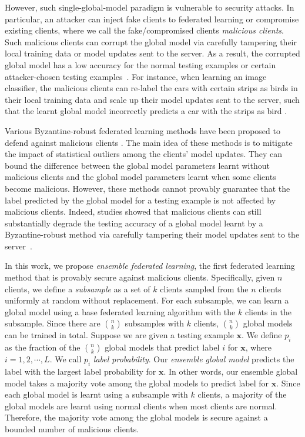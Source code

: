 \documentclass[letterpaper]{article} %
\begin{document}
However, such single-global-model paradigm is vulnerable to security attacks. In particular, an attacker can inject fake clients to federated learning or compromise existing clients, where we call the fake/compromised clients \emph{malicious clients}. Such malicious clients can corrupt the global model via carefully tampering their local training data or model updates sent to the server. As a result, the corrupted global model has a low accuracy for the normal testing examples \cite{fang2019local,Xie19} or certain attacker-chosen testing examples~\cite{Bagdasaryan18,Bhagoji19,xie2019dba}. For instance, when learning an image classifier, the malicious clients can re-label the cars with certain strips as birds in their local training data and scale up their model updates sent to the server, such that the learnt global model incorrectly predicts a car with the strips as bird \cite{Bagdasaryan18}.

Various Byzantine-robust federated learning methods have been proposed to defend against malicious clients \cite{Blanchard17,ChenPOMACS17,Mhamdi18,Yin18,yin2019defending,chen2018draco,alistarh2018byzantine}. The main idea of these methods  is to mitigate the impact of statistical outliers among the clients' model updates. They can bound the difference between the global model parameters learnt without malicious clients and the global model parameters learnt when some clients become malicious. However, these methods cannot provably guarantee that the label predicted by the global model for a testing example is not affected by malicious clients. Indeed, studies showed that malicious clients can still substantially degrade the testing accuracy of a global model learnt by a Byzantine-robust method via carefully tampering their model updates sent to the server~\cite{Bhagoji19,fang2019local,Xie19}.

In this work, we propose \emph{ensemble federated learning}, the first federated learning method that is provably secure against malicious clients. Specifically, given $n$ clients, we define a \emph{subsample} as a set of $k$ clients sampled from the $n$ clients uniformly at random without replacement. For each subsample, we can learn a global model using a base federated learning algorithm with the $k$ clients in the subsample. Since there are ${n \choose k}$ subsamples with $k$ clients, ${n \choose k}$ global models can be trained in total. Suppose we are given a testing example $\mathbf{x}$. We define $p_i$ as the fraction of the ${n \choose k}$ global models that predict label $i$ for $\mathbf{x}$, where $i=1,2,\cdots,L$. We call $p_i$ \emph{label probability}. Our \emph{ensemble global model} predicts the label with the largest label probability for $\mathbf{x}$. In other words, our ensemble global model takes a majority vote among the global models to predict label for $\mathbf{x}$. Since each global model is learnt using a subsample with $k$ clients, a majority of the global models are learnt using normal clients when most clients are normal. Therefore, the majority vote among the global models is secure against a bounded number of malicious clients.
\end{document}
